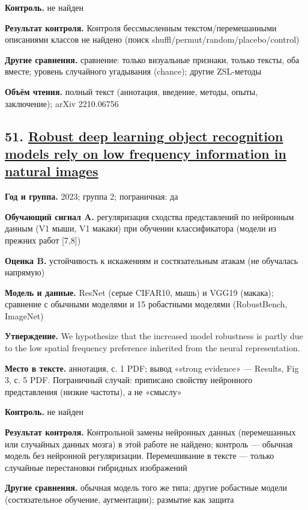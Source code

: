 \textbf{Контроль.} не найден

\textbf{Результат контроля.} Контроля бессмысленным текстом/перемешанными описаниями классов не найдено (поиск shuffl/permut/random/placebo/control)

\textbf{Другие сравнения.} сравнение: только визуальные признаки, только тексты, оба вместе; уровень случайного угадывания (chance); другие ZSL-методы

\textbf{Объём чтения.} полный текст (аннотация, введение, методы, опыты, заключение); arXiv 2210.06756


\subsection*{51. \href{https://doi.org/10.1371/journal.pcbi.1010932}{Robust deep learning object recognition models rely on low frequency information in natural images}}

\textbf{Год и группа.} 2023; группа 2; пограничная: да

\textbf{Обучающий сигнал A.} регуляризация сходства представлений по нейронным данным (V1 мыши, V1 макаки) при обучении классификатора (модели из прежних работ [7,8])

\textbf{Оценка B.} устойчивость к искажениям и состязательным атакам (не обучалась напрямую)

\textbf{Модель и данные.} ResNet (серые CIFAR10, мышь) и VGG19 (макака); сравнение с обычными моделями и 15 робастными моделями (RobustBench, ImageNet)

\textbf{Утверждение.} We hypothesize that the increased model robustness is partly due to the low spatial frequency preference inherited from the neural representation.

\textbf{Место в тексте.} аннотация, с. 1 PDF; вывод «strong evidence» — Results, Fig 3, с. 5 PDF. Пограничный случай: приписано свойству нейронного представления (низкие частоты), а не «смыслу»

\textbf{Контроль.} не найден

\textbf{Результат контроля.} Контрольной замены нейронных данных (перемешанных или случайных данных мозга) в этой работе не найдено; контроль — обычная модель без нейронной регуляризации. Перемешивание в тексте — только случайные перестановки гибридных изображений

\textbf{Другие сравнения.} обычная модель того же типа; другие робастные модели (состязательное обучение, аугментации); размытие как защита

